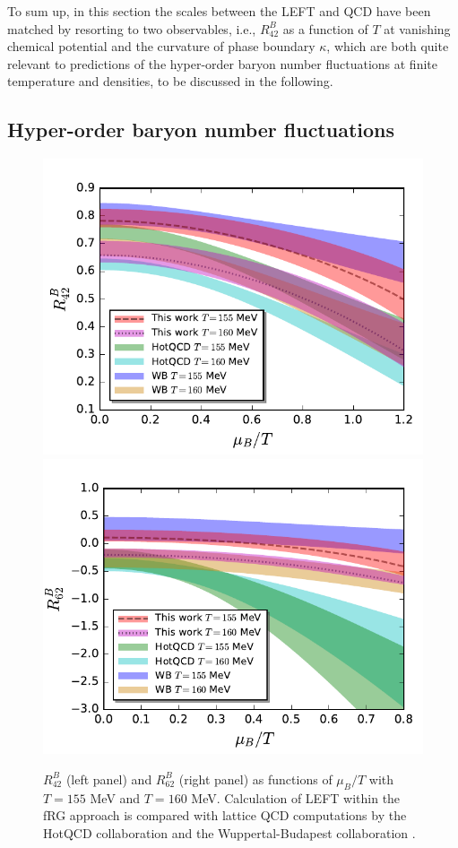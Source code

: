 \documentclass[%
reprint,
superscriptaddress,
showpacs,preprintnumbers,
 amsmath,amssymb,
 aps,
prd,
]{revtex4-1}
\begin{document}
To sum up, in this section the scales between the LEFT and QCD have been matched by resorting to two observables, i.e., $R^{B}_{42}$ as a function of $T$ at vanishing chemical potential and the curvature of phase boundary $\kappa$, which are both quite relevant to predictions of the hyper-order baryon number fluctuations at finite temperature and densities, to be discussed in the following. 

\subsection{Hyper-order baryon number fluctuations}
\label{subsec:hyper-order}

%
\begin{figure}[t]
\centering
\includegraphics[width=0.85\columnwidth]{R42-muBoT} 
\includegraphics[width=0.85\columnwidth]{R62-muBoT} 
\caption{$R^{B}_{42}$ (left panel) and $R^{B}_{62}$ (right panel) as functions of $\mu_B/T$ with $T=155$ MeV and $T=160$ MeV. Calculation of LEFT within the fRG approach is compared with lattice QCD computations by the HotQCD collaboration \cite{Bazavov:2020bjn} and the Wuppertal-Budapest collaboration \cite{Borsanyi:2018grb}.
} \label{fig:R42R62-muBoT}
\end{figure}
%
\end{document}
